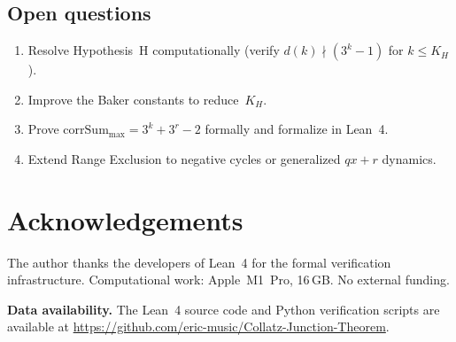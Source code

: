 \documentclass[11pt, a4paper]{amsart}
\theoremstyle{plain}
\theoremstyle{definition}
\theoremstyle{remark}
\newcommand{\corrSum}{\mathrm{corrSum}}
\begin{document}
\subsection{Open questions}\label{ssec:open}

\begin{enumerate}
  \item Resolve Hypothesis~H computationally
    (verify $d(k) \nmid (3^k-1)$ for $k \leq K_H$).
  \item Improve the Baker constants to reduce~$K_H$.
  \item Prove $\corrSum_{\max} = 3^k + 3^r - 2$ formally
    and formalize in Lean~4.
  \item Extend Range Exclusion to negative cycles or
    generalized $qx{+}r$ dynamics.
\end{enumerate}

\section*{Acknowledgements}

The author thanks the developers of Lean~4 for the formal
verification infrastructure.
Computational work: Apple~M1~Pro, 16\,GB.
No external funding.

\medskip\noindent\textbf{Data availability.}
The Lean~4 source code and Python verification scripts
are available at
\url{https://github.com/eric-music/Collatz-Junction-Theorem}.
\end{document}
